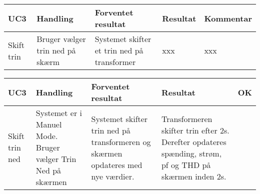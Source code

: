 \begin{table}[htbp]
	\centering
	\begin{tabular}{|p{2cm}|p{3.5cm}|p{4cm}|p{2cm}|p{2.5cm}|}
		\hline
		\textbf{UC3} & \textbf{Handling} & \textbf{Forventet resultat} & \textbf{Resultat} &\textbf{Kommentar} \\\hline
		Skift trin & Bruger vælger trin ned på skærm & Systemet skifter et trin ned på transformer & xxx & xxx \\\hline
	\end{tabular}
\end{table}

\begin{table}[H]
	\centering
	\begin{tabular}{|p{2cm}|p{3cm}|p{4cm}|p{4.5cm}|p{1cm}|}
		\hline
		\textbf{UC3} & \textbf{Handling} & \textbf{Forventet resultat} & \textbf{Resultat} &\textbf{OK} \\\hline
		Skift trin ned & Systemet er i Manuel Mode. Bruger vælger Trin Ned på skærmen & Systemet skifter trin ned på transformeren og skærmen opdateres med nye værdier. & Transformeren skifter trin efter 2s. Derefter opdateres spænding, strøm, pf og THD på skærmen inden 2s.  & \checkmark \\\hline
		
		
	\end{tabular}
	
	
\end{table}